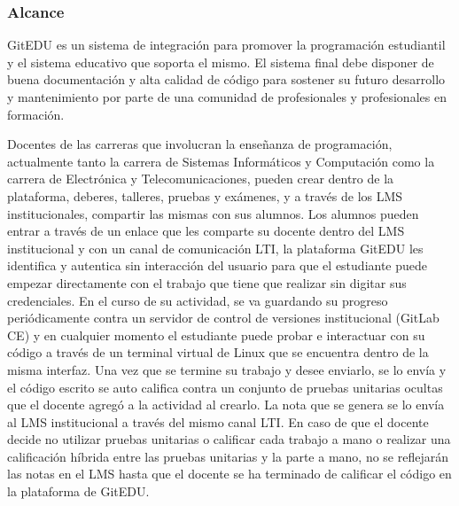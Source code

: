 \subsubsection{Alcance}
GitEDU es un sistema de integración para promover la programación estudiantil y el sistema educativo que soporta el mismo. El sistema final debe disponer de buena documentación y alta calidad de código para sostener su futuro desarrollo y mantenimiento por parte de una comunidad de profesionales y profesionales en formación.

      
Docentes de las carreras que involucran la enseñanza de programación, actualmente tanto la carrera de Sistemas Informáticos y Computación como la carrera de Electrónica y Telecomunicaciones, pueden crear dentro de la plataforma, deberes, talleres, pruebas y exámenes, y a través de los LMS  institucionales, compartir las mismas con sus alumnos. Los alumnos pueden entrar a través de un enlace que les comparte su docente dentro del LMS  institucional y con un canal de comunicación LTI, la plataforma GitEDU les identifica y autentica sin interacción del usuario para que el estudiante puede empezar directamente con el trabajo que tiene que realizar sin digitar sus credenciales. En el curso de su actividad, se va guardando su progreso periódicamente contra un servidor de control de versiones institucional (GitLab CE) y en cualquier momento el estudiante puede probar e interactuar con su código a través de un terminal virtual de Linux que se encuentra dentro de la misma interfaz. Una vez que se termine su trabajo y desee enviarlo, se lo envía y el código escrito se auto califica contra un conjunto de pruebas unitarias ocultas que el docente agregó a la actividad al crearlo. La nota que se genera se lo envía al LMS  institucional a través del mismo canal LTI. En caso de que el docente decide no utilizar pruebas unitarias o calificar cada trabajo a mano o realizar una calificación híbrida entre las pruebas unitarias y la parte a mano, no se reflejarán las notas en el LMS  hasta que el docente se ha terminado de calificar el código en la plataforma de GitEDU.

